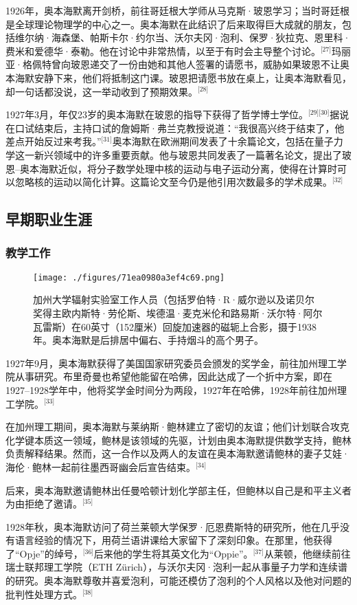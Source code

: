 1926年，奥本海默离开剑桥，前往哥廷根大学师从马克斯·玻恩学习；当时哥廷根是全球理论物理学的中心之一。奥本海默在此结识了后来取得巨大成就的朋友，包括维尔纳·海森堡、帕斯卡尔·约尔当、沃尔夫冈·泡利、保罗·狄拉克、恩里科·费米和爱德华·泰勒。他在讨论中非常热情，以至于有时会主导整个讨论。\(^\text{[27]}\)玛丽亚·格佩特曾向玻恩递交了一份由她和其他人签署的请愿书，威胁如果玻恩不让奥本海默安静下来，他们将抵制这门课。玻恩把请愿书放在桌上，让奥本海默看见，却一句话都没说，这一举动收到了预期效果。\(^\text{[28]}\)

1927年3月，年仅23岁的奥本海默在玻恩的指导下获得了哲学博士学位。\(^\text{[29][30]}\)据说在口试结束后，主持口试的詹姆斯·弗兰克教授说道：“我很高兴终于结束了，他差点开始反过来考我。”\(^\text{[31]}\)奥本海默在欧洲期间发表了十余篇论文，包括在量子力学这一新兴领域中的许多重要贡献。他与玻恩共同发表了一篇著名论文，提出了玻恩–奥本海默近似，将分子数学处理中核的运动与电子运动分离，使得在计算时可以忽略核的运动以简化计算。这篇论文至今仍是他引用次数最多的学术成果。\(^\text{[32]}\)
\subsection{早期职业生涯}
\subsubsection{教学工作}
\begin{figure}[ht]
\centering
\texttt{[image: ./figures/71ea0980a3ef4c69.png]}
\caption{加州大学辐射实验室工作人员（包括罗伯特·R·威尔逊以及诺贝尔奖得主欧内斯特·劳伦斯、埃德温·麦克米伦和路易斯·沃尔特·阿尔瓦雷斯）在60英寸（152厘米）回旋加速器的磁轭上合影，摄于1938年。奥本海默是后排居中偏右、手持烟斗的高个男子。} \label{fig_ABHM_3}
\end{figure}
1927年9月，奥本海默获得了美国国家研究委员会颁发的奖学金，前往加州理工学院从事研究。布里奇曼也希望他能留在哈佛，因此达成了一个折中方案，即在1927–1928学年中，他将奖学金时间分为两段，1927年在哈佛，1928年前往加州理工学院。\(^\text{[33]}\)

在加州理工期间，奥本海默与莱纳斯·鲍林建立了密切的友谊；他们计划联合攻克化学键本质这一领域，鲍林是该领域的先驱，计划由奥本海默提供数学支持，鲍林负责解释结果。然而，这一合作以及两人的友谊在奥本海默邀请鲍林的妻子艾娃·海伦·鲍林一起前往墨西哥幽会后宣告结束。\(^\text{[34]}\)

后来，奥本海默邀请鲍林出任曼哈顿计划化学部主任，但鲍林以自己是和平主义者为由拒绝了邀请。\(^\text{[35]}\)

1928年秋，奥本海默访问了荷兰莱顿大学保罗·厄恩费斯特的研究所，他在几乎没有语言经验的情况下，用荷兰语讲课给大家留下了深刻印象。在那里，他获得了“Opje”的绰号，\(^\text{[36]}\)后来他的学生将其英文化为“Oppie”。\(^\text{[37]}\)从莱顿，他继续前往瑞士联邦理工学院（ETH Zürich），与沃尔夫冈·泡利一起从事量子力学和连续谱的研究。奥本海默尊敬并喜爱泡利，可能还模仿了泡利的个人风格以及他对问题的批判性处理方式。\(^\text{[38]}\)


